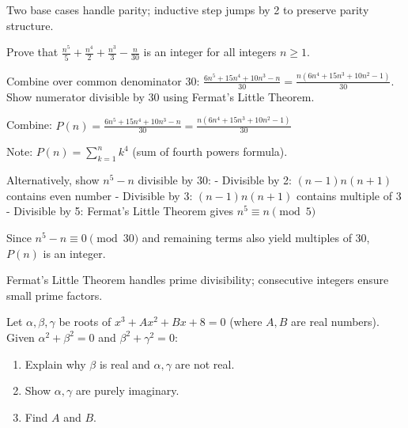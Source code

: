 \begin{takeaways}
Two base cases handle parity; inductive step jumps by 2 to preserve parity structure.
\end{takeaways}

\vspace{1cm}

\begin{problem}
Prove that $\frac{n^5}{5} + \frac{n^4}{2} + \frac{n^3}{3} - \frac{n}{30}$ is an integer for all integers $n \geq 1$.
\end{problem}

\vspace{0.5cm}
\begin{hintbox}
Combine over common denominator 30: $\frac{6n^5+15n^4+10n^3-n}{30} = \frac{n(6n^4+15n^3+10n^2-1)}{30}$. Show numerator divisible by 30 using Fermat's Little Theorem.
\end{hintbox}

\begin{solution}
Combine: $P(n) = \frac{6n^5+15n^4+10n^3-n}{30} = \frac{n(6n^4+15n^3+10n^2-1)}{30}$

Note: $P(n) = \sum_{k=1}^n k^4$ (sum of fourth powers formula).

Alternatively, show $n^5-n$ divisible by 30:
- Divisible by 2: $(n-1)n(n+1)$ contains even number
- Divisible by 3: $(n-1)n(n+1)$ contains multiple of 3
- Divisible by 5: Fermat's Little Theorem gives $n^5 \equiv n \pmod{5}$

Since $n^5-n \equiv 0 \pmod{30}$ and remaining terms also yield multiples of 30, $P(n)$ is an integer.

\end{solution}

\begin{takeaways}
Fermat's Little Theorem handles prime divisibility; consecutive integers ensure small prime factors.
\end{takeaways}

\vspace{1cm}

\begin{problem}
Let $\alpha, \beta, \gamma$ be roots of $x^3 + Ax^2 + Bx + 8 = 0$ (where $A, B$ are real numbers).
Given $\alpha^2 + \beta^2 = 0$ and $\beta^2 + \gamma^2 = 0$:
\begin{enumerate}
    \item Explain why $\beta$ is real and $\alpha, \gamma$ are not real.
    \item Show $\alpha, \gamma$ are purely imaginary.
    \item Find $A$ and $B$.
\end{enumerate}
\end{problem}

